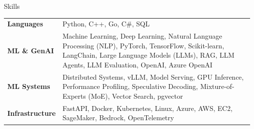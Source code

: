 \begin{rSection}{Skills}
    \small
    \begin{tabular}{@{} >{\bfseries}l @{\hspace{2ex}} p{} @{}}
        Languages & Python, C++, Go, C\#, SQL \\
        ML \& GenAI & Machine Learning, Deep Learning, Natural Language Processing (NLP), PyTorch, TensorFlow, Scikit-learn, LangChain, Large Language Models (LLMs), RAG, LLM Agents, LLM Evaluation, OpenAI, Azure OpenAI \\
        ML Systems & Distributed Systems, vLLM, Model Serving, GPU Inference, Performance Profiling, Speculative Decoding, Mixture-of-Experts (MoE), Vector Search, pgvector \\
        Infrastructure & FastAPI, Docker, Kubernetes, Linux, Azure, AWS, EC2, SageMaker, Bedrock, OpenTelemetry
    \end{tabular}
\end{rSection}
